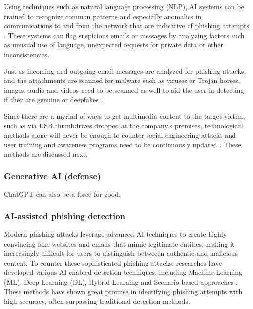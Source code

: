 Using techniques such as natural language processing (NLP), AI systems can be trained to recognize common patterns and especially anomalies in communications to and from the network that are indicative of phishing attempts \citep{basitComprehensiveSurveyAIenabledPhishingAttacks2021}. These systems can flag suspicious emails or messages by analyzing factors such as unusual use of language, unexpected requests for private data or other inconsistencies.

Just as incoming and outgoing email messages are analyzed for phishing attacks, and the attachments are scanned for malware such as viruses or Trojan horses, images, audio and videos need to be scanned as well to aid the user in detecting if they are genuine or deepfakes \citep{mirskyTheCreationAndDetectionOfDeepfakes2021}.

Since there are a myriad of ways to get multimedia content to the target victim, such as via USB thumbdrives dropped at the company's premises, technological methods alone will never be enough to counter social engineering attacks and user training and awareness programs need to be continuously updated \citep{hadnagySocialEngineering2018}. These methods are discussed next.

\subsubsection{Generative AI (defense)}
\begin{comment}

Generative AI (ChatGPT etc) for defensive purposes

What to cover:
    - How ChatGPT can find errors in code
    - ChatGPT can generate test cases for code
    - Datan analyysi poikkeamien löytämiseksi?
    
\end{comment}

ChatGPT can also be a force for good.

\subsubsection{AI-assisted phishing detection}

Modern phishing attacks leverage advanced AI techniques to create highly convincing fake websites and emails that mimic legitimate entities, making it increasingly difficult for users to distinguish betweeen authentic and malicious content. To counter these sophisticated phishing attacks, researches have developed various AI-enabled detection techniques, including Machine Learning (ML), Deep Learning (DL), Hybrid Learning and Scenario-based approaches \citep{basitComprehensiveSurveyAIenabledPhishingAttacks2021}. These methods have shown great promise in identifying phishing attempts with high accuracy, often surpassing traditional detection methods.


